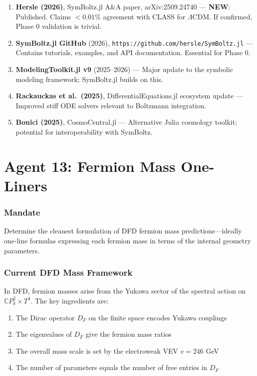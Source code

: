\documentclass[11pt,a4paper]{article}
\newcommand{\NEW}{\textcolor{dfdblue}{\textbf{NEW}}}
\newcommand{\CP}{\mathbb{C}P}
\begin{document}
\begin{enumerate}
\item \textbf{Hersle (2026)}, SymBoltz.jl A\&A paper, arXiv:2509.24740 --- \NEW: Published. Claims $< 0.01\%$ agreement with CLASS for $\Lambda$CDM. If confirmed, Phase 0 validation is trivial.

\item \textbf{SymBoltz.jl GitHub} (2026), \texttt{https://github.com/hersle/SymBoltz.jl} --- Contains tutorials, examples, and API documentation. Essential for Phase 0.

\item \textbf{ModelingToolkit.jl v9} (2025--2026) --- Major update to the symbolic modeling framework; SymBoltz.jl builds on this.

\item \textbf{Rackauckas et al.\ (2025)}, DifferentialEquations.jl ecosystem update --- Improved stiff ODE solvers relevant to Boltzmann integration.

\item \textbf{Bonici (2025)}, CosmoCentral.jl --- Alternative Julia cosmology toolkit; potential for interoperability with SymBoltz.
\end{enumerate}


\part{Agent 13: Fermion Mass One-Liners}
\label{part:agent13}

\section{Mandate}

Determine the cleanest formulation of DFD fermion mass predictions---ideally one-line formulas expressing each fermion mass in terms of the internal geometry parameters.

\section{Current DFD Mass Framework}

In DFD, fermion masses arise from the Yukawa sector of the spectral action on $\CP^2_k \times T^4$. The key ingredients are:

\begin{enumerate}
\item The Dirac operator $D_F$ on the finite space encodes Yukawa couplings
\item The eigenvalues of $D_F$ give the fermion mass ratios
\item The overall mass scale is set by the electroweak VEV $v = 246$ GeV
\item The number of parameters equals the number of free entries in $D_F$
\end{enumerate}
\end{document}

